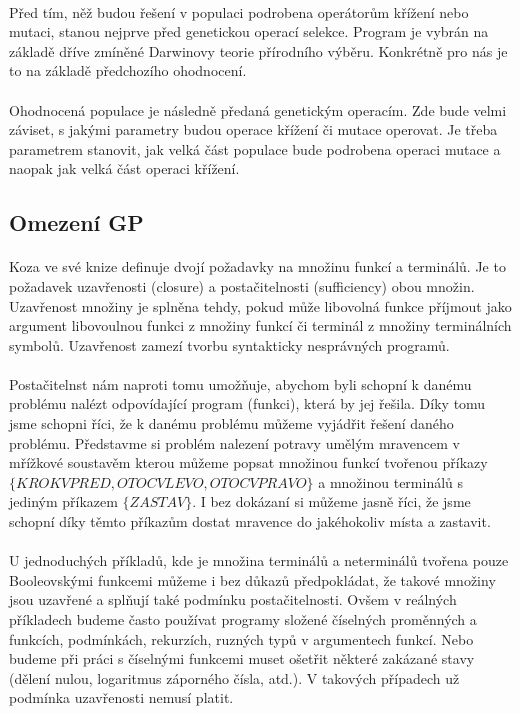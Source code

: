 \documentclass[bc,male,java,dept460]{diploma}		%
\begin{document}
\paragraph*{}
Před tím, něž budou řešení v populaci podrobena operátorům křížení nebo mutaci, stanou nejprve před genetickou operací selekce. Program je vybrán na základě dříve zmíněné Darwinovy teorie přírodního výběru. Konkrétně pro nás je to na základě předchozího ohodnocení.

\paragraph*{}
Ohodnocená populace je následně předaná genetickým operacím. Zde bude velmi záviset, s jakými parametry budou operace křížení či mutace operovat. Je třeba parametrem stanovit, jak velká část populace bude podrobena operaci mutace a naopak jak velká část operaci křížení. 

\subsection{Omezení GP}
\paragraph*{}
Koza ve své knize definuje \cite{kozagp} dvojí požadavky na množinu funkcí a terminálů. Je to požadavek uzavřenosti (closure) a postačitelnosti (sufficiency) obou množin. Uzavřenost množiny je splněna tehdy, pokud může libovolná funkce příjmout jako argument libovoulnou funkci z množiny funkcí či terminál z množiny terminálních symbolů. Uzavřenost zamezí tvorbu syntakticky nesprávných programů.

\paragraph*{}
Postačitelnst nám naproti tomu umožňuje, abychom byli schopní k danému problému nalézt odpovídající program (funkci), která by jej řešila. Díky tomu jsme schopni říci, že k danému problému můžeme vyjádřit řešení daného problému. Představme si problém nalezení potravy umělým mravencem v mřížkové soustavěm kterou můžeme popsat množinou funkcí tvořenou příkazy $\{KROK VPRED, OTOC VLEVO, OTOC VPRAVO\}$ a množinou terminálů s jediným příkazem $\{ZASTAV\}$. I bez dokázaní si můžeme jasně říci, že jsme schopní díky těmto příkazům dostat mravence do jakéhokoliv místa a zastavit.

\paragraph*{}
U jednoduchých příkladů, kde je množina terminálů a neterminálů tvořena pouze Booleovskými funkcemi můžeme i bez důkazů předpokládat, že takové množiny jsou uzavřené a splňují také podmínku postačitelnosti. Ovšem v reálných příkladech budeme často používat programy složené číselných proměnných a funkcích, podmínkách, rekurzích, ruzných typů v argumentech funkcí. Nebo budeme při práci s číselnými funkcemi muset ošetřit některé zakázané stavy (dělení nulou, logaritmus záporného čísla, atd.). V takových případech už podmínka uzavřenosti nemusí platit.
\end{document}
